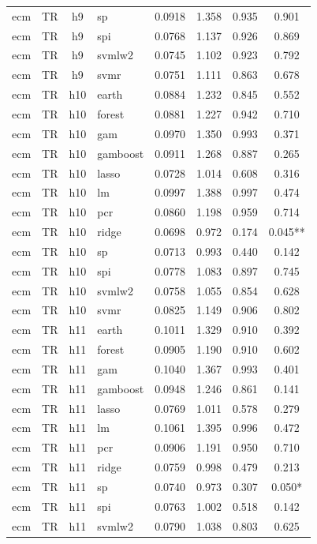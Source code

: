 \begin{ThreePartTable}
\begin{longtable}[t]{llclcccc}
ecm & TR & h9 & sp & 0.0918 & 1.358 & 0.935 & 0.901\\
ecm & TR & h9 & spi & 0.0768 & 1.137 & 0.926 & 0.869\\
ecm & TR & h9 & svmlw2 & 0.0745 & 1.102 & 0.923 & 0.792\\
ecm & TR & h9 & svmr & 0.0751 & 1.111 & 0.863 & 0.678\\
\addlinespace
ecm & TR & h10 & earth & 0.0884 & 1.232 & 0.845 & 0.552\\
ecm & TR & h10 & forest & 0.0881 & 1.227 & 0.942 & 0.710\\
ecm & TR & h10 & gam & 0.0970 & 1.350 & 0.993 & 0.371\\
ecm & TR & h10 & gamboost & 0.0911 & 1.268 & 0.887 & 0.265\\
ecm & TR & h10 & lasso & 0.0728 & 1.014 & 0.608 & 0.316\\
ecm & TR & h10 & lm & 0.0997 & 1.388 & 0.997 & 0.474\\
ecm & TR & h10 & pcr & 0.0860 & 1.198 & 0.959 & 0.714\\
ecm & TR & h10 & ridge & 0.0698 & 0.972 & 0.174 & 0.045**\\
ecm & TR & h10 & sp & 0.0713 & 0.993 & 0.440 & 0.142\\
ecm & TR & h10 & spi & 0.0778 & 1.083 & 0.897 & 0.745\\
ecm & TR & h10 & svmlw2 & 0.0758 & 1.055 & 0.854 & 0.628\\
ecm & TR & h10 & svmr & 0.0825 & 1.149 & 0.906 & 0.802\\
\addlinespace
ecm & TR & h11 & earth & 0.1011 & 1.329 & 0.910 & 0.392\\
ecm & TR & h11 & forest & 0.0905 & 1.190 & 0.910 & 0.602\\
ecm & TR & h11 & gam & 0.1040 & 1.367 & 0.993 & 0.401\\
ecm & TR & h11 & gamboost & 0.0948 & 1.246 & 0.861 & 0.141\\
ecm & TR & h11 & lasso & 0.0769 & 1.011 & 0.578 & 0.279\\
ecm & TR & h11 & lm & 0.1061 & 1.395 & 0.996 & 0.472\\
ecm & TR & h11 & pcr & 0.0906 & 1.191 & 0.950 & 0.710\\
ecm & TR & h11 & ridge & 0.0759 & 0.998 & 0.479 & 0.213\\
ecm & TR & h11 & sp & 0.0740 & 0.973 & 0.307 & 0.050*\\
ecm & TR & h11 & spi & 0.0763 & 1.002 & 0.518 & 0.142\\
ecm & TR & h11 & svmlw2 & 0.0790 & 1.038 & 0.803 & 0.625\\

\end{longtable}
\end{ThreePartTable}
